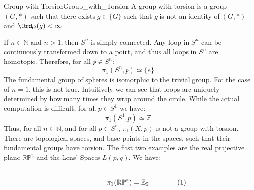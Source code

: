 \documentclass{book}                                                           %
\begin{document}
            \begin{ldefinition}{Group with Torsion}{Group_with_Torsion}
                A group with torsion is a group $(G,*)$ such that
                there exists $g\in\{G\}$ such that $g$ is not an identity
                of $(G,*)$ and $\Ord_{G}(g)<\infty$.
            \end{ldefinition}
            \begin{lexample}{}{}
                If $n\in\mathbb{N}$ and $n>1$, then $S^{n}$ is simply connected.
                Any loop in $S^{n}$ can be continuously transformed down to a
                point, and thus all loops in $S^{n}$ are homotopic. Therefore, for
                all $p\in{S}^{n}$:
                \begin{equation}
                    \pi_{1}(S^{n},p)\simeq\{e\}
                \end{equation}
                The fundamental group of spheres is isomorphic to the trivial group.
                For the case of $n=1$, this is not true. Intuitively we can see
                that loops are uniquely determined by how many times they wrap around
                the circle. While the actual computation is difficult, for all
                $p\in{S}^{1}$ we have:
                \begin{equation}
                    \pi_{1}(S^{1},p)\simeq\mathbb{Z}
                \end{equation}
                Thus, for all $n\in\mathbb{N}$, and for all $p\in{S}^{n}$,
                $\pi_{1}(X,p)$ is not a group with torsion. There are
                topological spaces, and base points in the spaces, such that
                their fundamental groups have torsion. The first two examples
                are the real projective plane $\mathbb{RP}^{n}$ and the Lens'
                Spaces
                $L(p,q)$. We have:
                \par
                \begin{subequations}
                    \begin{minipage}[b]{0.49\textwidth}
                        \centering
                        \begin{equation}
                            \pi_{1}(\mathbb{RP}^{n})
                            =\mathbb{Z}_{2}
                        \end{equation}
                    \end{minipage}
                    \hfill
                    \begin{minipage}[b]{0.49\textwidth}

\end{minipage}
\end{subequations}
\end{lexample}
\end{document}
